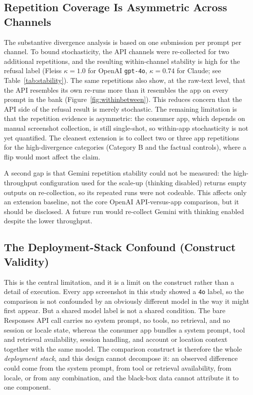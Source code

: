 \subsection{Repetition Coverage Is Asymmetric Across Channels}

The substantive divergence analysis is based on one submission per prompt per
channel. To bound stochasticity, the API channels were re-collected for two
additional repetitions, and the resulting within-channel stability is high for
the refusal label (Fleiss $\kappa=1.0$ for OpenAI \texttt{gpt-4o}, $\kappa=0.74$
for Claude; see Table~\ref{tab:stability}). The same repetitions also show, at
the raw-text level, that the API resembles its own re-runs more than it
resembles the app on every prompt in the bank
(Figure~\ref{fig:withinbetween}). This reduces concern that the API
side of the refusal result is merely stochastic. The remaining limitation is that
the repetition evidence is asymmetric: the consumer
app, which depends on manual screenshot collection, is still single-shot, so
within-app stochasticity is not yet quantified. The cleanest extension is to
collect two or three app repetitions for the high-divergence categories (Category
B and the factual controls), where a flip would most affect the claim.

A second gap is that Gemini repetition stability could not be measured: the
high-throughput configuration used for the scale-up (thinking disabled) returns
empty outputs on re-collection, so its repeated runs were not codeable. This
affects only an extension baseline, not the core OpenAI API-versus-app
comparison, but it should be disclosed. A future run would re-collect Gemini with
thinking enabled despite the lower throughput.

\subsection{The Deployment-Stack Confound (Construct Validity)}

This is the central limitation, and it is a limit on the construct rather than a
detail of execution. Every app screenshot in this study showed a \texttt{4o}
label, so the comparison is not confounded by an obviously different model in the
way it might first appear. But a shared model label is not a shared condition. The
bare Responses API call carries no system prompt, no tools, no retrieval, and no
session or locale state, whereas the consumer app bundles a system prompt, tool
and retrieval availability, session handling, and account or location context
together with the same model. The comparison construct is therefore the whole
\emph{deployment stack}, and this design cannot decompose it: an observed
difference could come from the system prompt, from tool or retrieval availability,
from locale, or from any combination, and the black-box data cannot attribute it
to one component.

